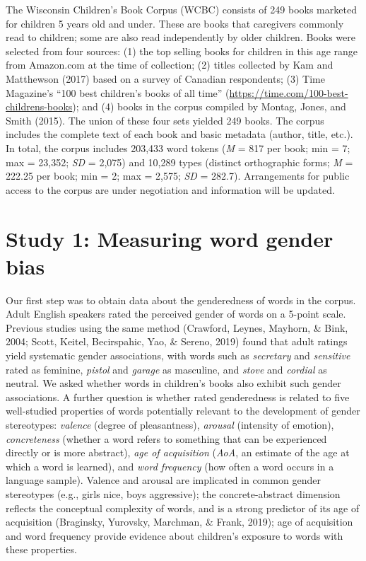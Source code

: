\documentclass[english,,man,floatsintext]{apa6}
\begin{document}
The Wisconsin Children's Book Corpus (WCBC) consists of 249 books marketed for children 5 years old and under. These are books that caregivers commonly read to children; some are also read independently by older children. Books were selected from four sources: (1) the top selling books for children in this age range from Amazon.com at the time of collection; (2) titles collected by Kam and Matthewson (2017) based on a survey of Canadian respondents; (3) Time Magazine's \enquote{100 best children's books of all time} (\url{https://time.com/100-best-childrens-books}); and (4) books in the corpus compiled by Montag, Jones, and Smith (2015). The union of these four sets yielded 249 books. The corpus includes the complete text of each book and basic metadata (author, title, etc.). In total, the corpus includes 203,433 word tokens (\emph{M} = 817 per book; min = 7; max = 23,352; \emph{SD} = 2,075) and 10,289 types (distinct orthographic forms; \emph{M} = 222.25 per book; min = 2; max = 2,575; \emph{SD} = 282.7). Arrangements for public access to the corpus are under negotiation and information will be updated.

\hypertarget{study-1-measuring-word-gender-bias}{%
\section{Study 1: Measuring word gender bias}\label{study-1-measuring-word-gender-bias}}

Our first step was to obtain data about the genderedness of words in the corpus. Adult English speakers rated the perceived gender of words on a 5-point scale. Previous studies using the same method (Crawford, Leynes, Mayhorn, \& Bink, 2004; Scott, Keitel, Becirspahic, Yao, \& Sereno, 2019) found that adult ratings yield systematic gender associations, with words such as \emph{secretary} and \emph{sensitive} rated as feminine, \emph{pistol} and \emph{garage} as masculine, and \emph{stove} and \emph{cordial} as neutral. We asked whether words in children's books also exhibit such gender associations. A further question is whether rated genderedness is related to five well-studied properties of words potentially relevant to the development of gender stereotypes: \emph{valence} (degree of pleasantness), \emph{arousal} (intensity of emotion), \emph{concreteness} (whether a word refers to something that can be experienced directly or is more abstract), \emph{age of acquisition} (\emph{AoA}, an estimate of the age at which a word is learned), and \emph{word frequency} (how often a word occurs in a language sample). Valence and arousal are implicated in common gender stereotypes (e.g., girls nice, boys aggressive); the concrete-abstract dimension reflects the conceptual complexity of words, and is a strong predictor of its age of acquisition (Braginsky, Yurovsky, Marchman, \& Frank, 2019); age of acquisition and word frequency provide evidence about children's exposure to words with these properties.
\end{document}
